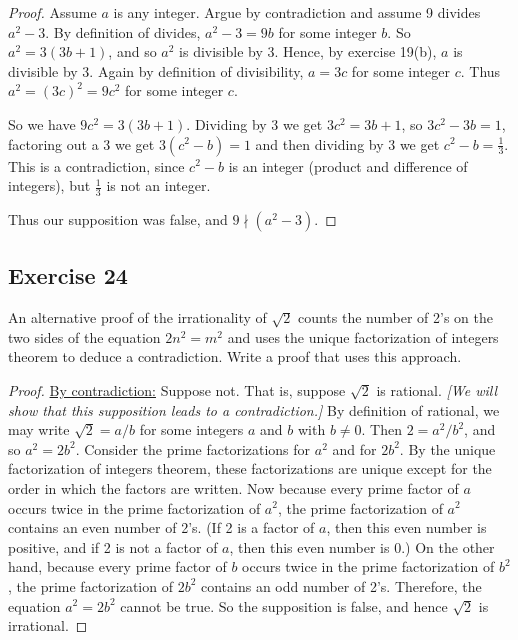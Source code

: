 \documentclass[14pt]{extarticle}
\begin{document}
\begin{proof}
Assume $a$ is any integer. Argue by contradiction and assume 9 divides $a^2 - 3$. By definition of divides, $a^2 - 3 = 9b$ for some integer $b$. So $a^2 = 3(3b + 1)$, and so $a^2$ is divisible by 3. Hence, by exercise 19(b), $a$ is divisible by 3. Again by definition of divisibility, $a = 3c$ for some integer $c$. Thus $a^2 = (3c)^2 = 9c^2$ for some integer $c$. 

So we have $9c^2 = 3(3b+1)$. Dividing by 3 we get $3c^2 = 3b+1$, so $3c^2 - 3b = 1$, factoring out a 3 we get $3(c^2 - b) = 1$ and then dividing by 3 we get $c^2 - b = \frac{1}{3}$. This is a contradiction, since $c^2 - b$ is an integer (product and difference of integers), but $\frac{1}{3}$ is not an integer.

Thus our supposition was false, and $9 \nmid (a^2 - 3)$.
\end{proof}

\subsection{Exercise 24}
An alternative proof of the irrationality of $\sqrt{2}$ counts the number of 2’s on the two sides of the equation $2n^2 = m^2$ and uses the unique factorization of integers theorem to deduce a contradiction. Write a proof that uses this approach.

\begin{proof}
\underline{By contradiction:} Suppose not. That is, suppose
$\sqrt{2}$ is rational. {\it [We will show that this supposition leads to a contradiction.]} By definition of rational, we may write $\sqrt{2} = a/b$ for some integers $a$ and $b$ with $b \neq 0$. Then $2 = a^2/b^2$, and so $a^2 = 2b^2$. Consider the prime factorizations for $a^2$ and for $2b^2$. By the unique factorization of integers theorem, these factorizations are unique except for the order in which the factors are written. Now because every prime factor of $a$ occurs twice in the prime factorization of $a^2$, the prime factorization of $a^2$ contains an even number of 2’s. (If 2 is a factor of $a$, then this even number is positive, and if 2 is not a factor of $a$, then this even number is 0.) On the other hand, because every prime factor of $b$ occurs twice in the prime factorization of $b^2$, the prime factorization of $2b^2$ contains an odd number of 2’s. Therefore, the equation $a^2 = 2b^2$ cannot be true. So the supposition is false, and hence $\sqrt{2}$ is irrational.
\end{proof}
\end{document}
